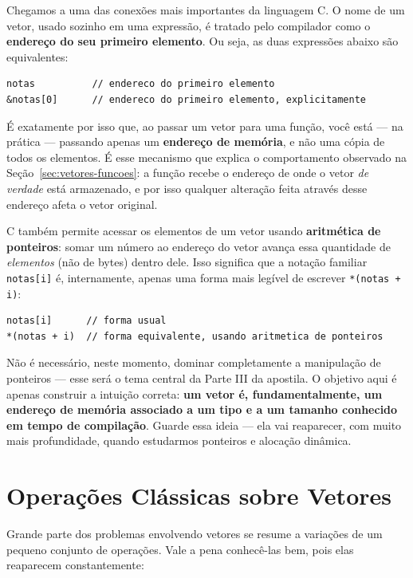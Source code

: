 Chegamos a uma das conexões mais importantes da linguagem C. O nome de um vetor, usado sozinho em uma expressão, é tratado pelo compilador como o \textbf{endereço do seu primeiro elemento}. Ou seja, as duas expressões abaixo são equivalentes:

\begin{lstlisting}
notas          // endereco do primeiro elemento
&notas[0]      // endereco do primeiro elemento, explicitamente
\end{lstlisting}

É exatamente por isso que, ao passar um vetor para uma função, você está — na prática — passando apenas um \textbf{endereço de memória}, e não uma cópia de todos os elementos. É esse mecanismo que explica o comportamento observado na Seção~\ref{sec:vetores-funcoes}: a função recebe o endereço de onde o vetor \textit{de verdade} está armazenado, e por isso qualquer alteração feita através desse endereço afeta o vetor original.

C também permite acessar os elementos de um vetor usando \textbf{aritmética de ponteiros}: somar um número ao endereço do vetor avança essa quantidade de \textit{elementos} (não de bytes) dentro dele. Isso significa que a notação familiar \texttt{notas[i]} é, internamente, apenas uma forma mais legível de escrever \texttt{*(notas + i)}:

\begin{lstlisting}
notas[i]      // forma usual
*(notas + i)  // forma equivalente, usando aritmetica de ponteiros
\end{lstlisting}

Não é necessário, neste momento, dominar completamente a manipulação de ponteiros — esse será o tema central da Parte III da apostila. O objetivo aqui é apenas construir a intuição correta: \textbf{um vetor é, fundamentalmente, um endereço de memória associado a um tipo e a um tamanho conhecido em tempo de compilação}. Guarde essa ideia — ela vai reaparecer, com muito mais profundidade, quando estudarmos ponteiros e alocação dinâmica.

\section{Operações Clássicas sobre Vetores}

Grande parte dos problemas envolvendo vetores se resume a variações de um pequeno conjunto de operações. Vale a pena conhecê-las bem, pois elas reaparecem constantemente:

